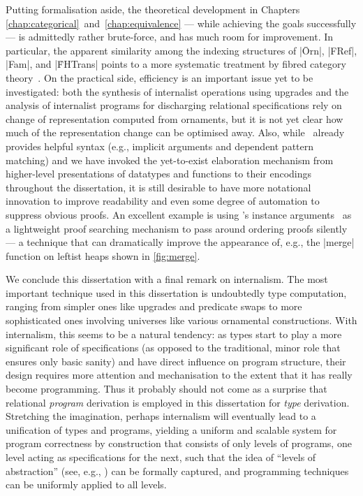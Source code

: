 Putting formalisation aside, the theoretical development in Chapters \ref{chap:categorical}~and~\ref{chap:equivalence} --- while achieving the goals successfully --- is admittedly rather brute-force, and has much room for improvement.
In particular, the apparent similarity among the indexing structures of |Ōrn|, |FRef|, |Fam|, and |ḞHTrans| points to a more systematic treatment by fibred category theory~\citep{Jacobs-categorical-logic-and-type-theory}.
On the practical side, efficiency is an important issue yet to be investigated: both the synthesis of internalist operations using upgrades and the analysis of internalist programs for discharging relational specifications rely on change of representation computed from ornaments, but it is not yet clear how much of the representation change can be optimised away.
Also, while \Agda\ already provides helpful syntax (e.g., implicit arguments and dependent pattern matching) and we have invoked the yet-to-exist elaboration mechanism from higher-level presentations of datatypes and functions to their encodings throughout the dissertation, it is still desirable to have more notational innovation to improve readability and even some degree of automation to suppress obvious proofs.
An excellent example is  using \Agda's instance arguments~\citep{Devriese-instance-arguments} as a lightweight proof searching mechanism to pass around ordering proofs silently --- a technique that can dramatically improve the appearance of, e.g., the |merge| function on leftist heaps shown in \autoref{fig:merge}.

We conclude this dissertation with a final remark on internalism.
The most important technique used in this dissertation is undoubtedly type computation, ranging from simpler ones like upgrades and predicate swaps to more sophisticated ones involving universes like various ornamental constructions.
With internalism, this seems to be a natural tendency: as types start to play a more significant role of specifications (as opposed to the traditional, minor role that ensures only basic sanity) and have direct influence on program structure, their design requires more attention and mechanisation to the extent that it has really become programming.
Thus it probably should not come as a surprise that relational \emph{program} derivation is employed in this dissertation for \emph{type} derivation.
Stretching the imagination, perhaps internalism will eventually lead to a unification of types and programs, yielding a uniform and scalable system for program correctness by construction that consists of only levels of programs, one level acting as specifications for the next, such that the idea of ``levels of abstraction'' (see, e.g., \citet{Dijkstra-notes-on-structured-programming}) can be formally captured, and programming techniques can be uniformly applied to all levels.
